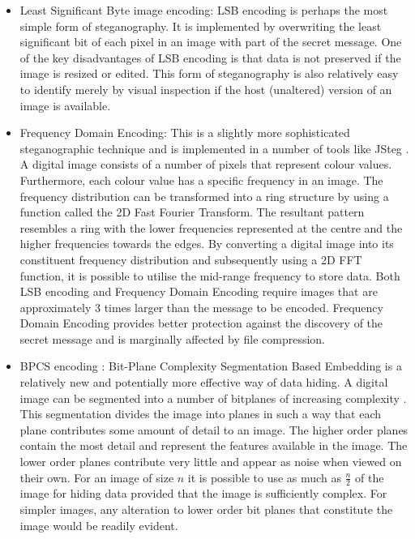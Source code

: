 \documentclass[12pt]{extreport}
\begin{document}
\begin{itemize}
\item Least Significant Byte image encoding:  LSB encoding is perhaps the most simple form of steganography. It is implemented by overwriting the least significant bit of each pixel in an image with part of the secret message. One of the key disadvantages of LSB encoding is that data is not preserved if the image is resized or edited. This form of steganography is also relatively easy to identify merely by visual inspection if the host (unaltered) version of an image is available.
\item Frequency Domain Encoding: This is a slightly more sophisticated steganographic technique and is implemented in a number of tools like JSteg \cite{jsteg}. A digital image consists of a number of pixels that represent colour values. Furthermore, each colour value has a specific frequency in an image. The frequency distribution can be transformed into a ring structure by using a function called the 2D Fast Fourier Transform. The resultant pattern resembles a ring with the lower frequencies represented at the centre and the higher frequencies towards the edges. By converting a digital image into its constituent  frequency distribution and subsequently using a 2D FFT function, it is possible to utilise the mid-range frequency to store data. Both LSB encoding and Frequency Domain Encoding require images that are approximately 3 times larger than the message to be encoded. Frequency Domain Encoding provides better protection against the discovery of the secret message and is marginally affected by file compression. 
\item BPCS encoding : Bit-Plane Complexity Segmentation Based Embedding is a relatively new and potentially more effective way of data hiding.  A digital image can be segmented into a number of bitplanes of increasing complexity \cite{kawaguchi1998concept}. This segmentation divides the image into planes in such a way that each plane contributes some amount of detail to an image. The higher order planes contain the most detail and represent the features available in the image. The lower order planes contribute very little and appear as noise when viewed on their own.  For an image of size $n$ it is possible to use as much as $\frac{n}{2}$ of the image for hiding data provided that the image is sufficiently complex. For simpler images, any alteration to lower order bit planes that constitute the image would be readily evident.

\end{itemize}
\end{document}
